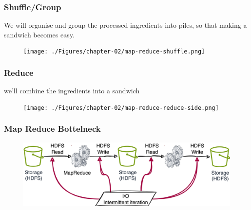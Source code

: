 \begin{frame}
	\frametitle{Shuffle/Group}
	We will organise and group the processed ingredients into piles, so that making a sandwich becomes easy.
		\begin{figure}
		\texttt{[image: ./Figures/chapter-02/map-reduce-shuffle.png]}
	\end{figure}
\end{frame}
\begin{frame}
	\frametitle{Reduce}
	we’ll combine the ingredients into a sandwich
	\begin{figure}
		\texttt{[image: ./Figures/chapter-02/map-reduce-reduce-side.png]}
	\end{figure}
\end{frame}
\begin{frame}
	\frametitle{Map Reduce Bottelneck}
	\begin{figure}
		\includegraphics[width=.96\textwidth,height=.6\textheight]{./Figures/chapter-04/MR}
	\end{figure}
\end{frame}
